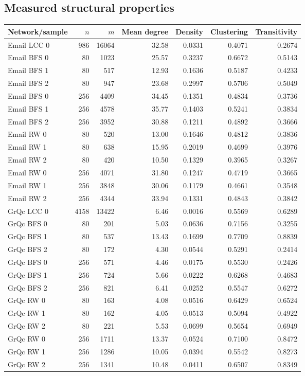 \documentclass[11pt]{article}
\begin{document}
\subsection{Measured structural properties}
\begin{longtable}{lrrrrrr}
\toprule Network/sample & $n$ & $m$ & Mean degree & Density & Clustering & Transitivity\\ \midrule\endhead
Email LCC 0 & 986 & 16064 & 32.58 & 0.0331 & 0.4071 & 0.2674\\
Email BFS 0 & 80 & 1023 & 25.57 & 0.3237 & 0.6672 & 0.5143\\
Email BFS 1 & 80 & 517 & 12.93 & 0.1636 & 0.5187 & 0.4233\\
Email BFS 2 & 80 & 947 & 23.68 & 0.2997 & 0.5706 & 0.5049\\
Email BFS 0 & 256 & 4409 & 34.45 & 0.1351 & 0.4834 & 0.3736\\
Email BFS 1 & 256 & 4578 & 35.77 & 0.1403 & 0.5241 & 0.3834\\
Email BFS 2 & 256 & 3952 & 30.88 & 0.1211 & 0.4892 & 0.3666\\
Email RW 0 & 80 & 520 & 13.00 & 0.1646 & 0.4812 & 0.3836\\
Email RW 1 & 80 & 638 & 15.95 & 0.2019 & 0.4699 & 0.3976\\
Email RW 2 & 80 & 420 & 10.50 & 0.1329 & 0.3965 & 0.3267\\
Email RW 0 & 256 & 4071 & 31.80 & 0.1247 & 0.4719 & 0.3665\\
Email RW 1 & 256 & 3848 & 30.06 & 0.1179 & 0.4661 & 0.3548\\
Email RW 2 & 256 & 4344 & 33.94 & 0.1331 & 0.4843 & 0.3842\\
GrQc LCC 0 & 4158 & 13422 & 6.46 & 0.0016 & 0.5569 & 0.6289\\
GrQc BFS 0 & 80 & 201 & 5.03 & 0.0636 & 0.7156 & 0.3255\\
GrQc BFS 1 & 80 & 537 & 13.43 & 0.1699 & 0.7709 & 0.8839\\
GrQc BFS 2 & 80 & 172 & 4.30 & 0.0544 & 0.5291 & 0.2414\\
GrQc BFS 0 & 256 & 571 & 4.46 & 0.0175 & 0.5530 & 0.2426\\
GrQc BFS 1 & 256 & 724 & 5.66 & 0.0222 & 0.6268 & 0.4683\\
GrQc BFS 2 & 256 & 821 & 6.41 & 0.0252 & 0.5547 & 0.6272\\
GrQc RW 0 & 80 & 163 & 4.08 & 0.0516 & 0.6429 & 0.6524\\
GrQc RW 1 & 80 & 162 & 4.05 & 0.0513 & 0.5094 & 0.4922\\
GrQc RW 2 & 80 & 221 & 5.53 & 0.0699 & 0.5654 & 0.6949\\
GrQc RW 0 & 256 & 1711 & 13.37 & 0.0524 & 0.7100 & 0.8472\\
GrQc RW 1 & 256 & 1286 & 10.05 & 0.0394 & 0.5542 & 0.8273\\
GrQc RW 2 & 256 & 1341 & 10.48 & 0.0411 & 0.6507 & 0.8349\\
\bottomrule\end{longtable}
\end{document}
